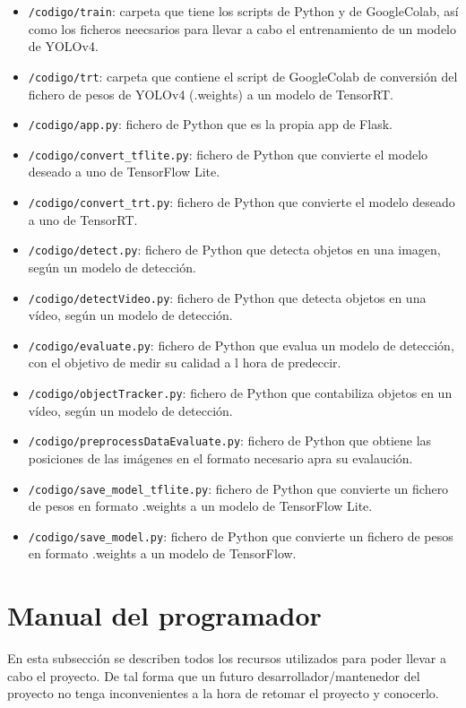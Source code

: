 \begin{itemize}
    \item \texttt{/codigo/train}: carpeta que tiene los scripts de Python y de GoogleColab, así como los ficheros neecsarios para llevar a cabo el entrenamiento de un modelo de YOLOv4.
    \item \texttt{/codigo/trt}: carpeta que contiene el script de GoogleColab de conversión del fichero de pesos de YOLOv4 (.weights) a un modelo de TensorRT.
    \item \texttt{/codigo/app.py}: fichero de Python que es la propia app de Flask.
    \item \texttt{/codigo/convert\_tflite.py}: fichero de Python que convierte el modelo deseado a uno de TensorFlow Lite.
    \item \texttt{/codigo/convert\_trt.py}: fichero de Python que convierte el modelo deseado a uno de TensorRT.
    \item \texttt{/codigo/detect.py}: fichero de Python que detecta objetos en una imagen, según un modelo de detección.
    \item \texttt{/codigo/detectVideo.py}: fichero de Python que detecta objetos en una vídeo, según un modelo de detección.
    \item \texttt{/codigo/evaluate.py}: fichero de Python que evalua un modelo de detección, con el objetivo de medir su calidad a l hora de predeccir.
    \item \texttt{/codigo/objectTracker.py}: fichero de Python que contabiliza objetos en un vídeo, según un modelo de detección.
    \item \texttt{/codigo/preprocessDataEvaluate.py}: fichero de Python que obtiene las posiciones de las imágenes en el formato necesario apra su evalaución.
    \item \texttt{/codigo/save\_model\_tflite.py}: fichero de Python que convierte un fichero de pesos en formato .weights a un modelo de TensorFlow Lite. 
    \item \texttt{/codigo/save\_model.py}: fichero de Python que convierte un fichero de pesos en formato .weights a un modelo de TensorFlow.  
\end{itemize}

\section{Manual del programador}
En esta subsección se describen todos los recursos utilizados para poder llevar a cabo el proyecto.
De tal forma que un futuro desarrollador/mantenedor del proyecto no tenga inconvenientes a la hora de retomar el proyecto y conocerlo.

